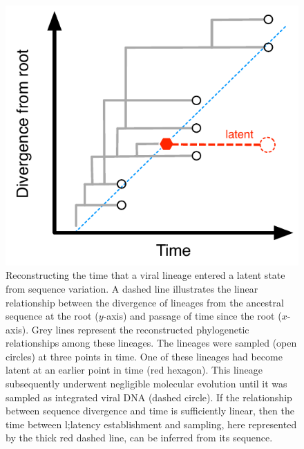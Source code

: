 \documentclass[12pt]{article}
\begin{document}
\begin{figure}[p]
	\centering
	\includegraphics{figures/latency-scheme}
	\caption[Latency Scheme]{
	{Reconstructing the time that a viral lineage entered a latent state from sequence variation.}
	A dashed line illustrates the linear relationship between the divergence of lineages from the ancestral sequence at the root ($y$-axis) and passage of time since the root ($x$-axis).
	Grey lines represent the reconstructed phylogenetic relationships among these lineages.
	The lineages were sampled (open circles) at three points in time.
	One of these lineages had become latent at an earlier point in time (red hexagon).
	This lineage subsequently underwent negligible molecular evolution until it was sampled as integrated viral DNA (dashed circle).
	If the relationship between sequence divergence and time is sufficiently linear, then the time between l;latency establishment and sampling, here represented by the thick red dashed line, can be inferred from its sequence.
	}
	\label{fig:latenttree}
\end{figure}
\end{document}
